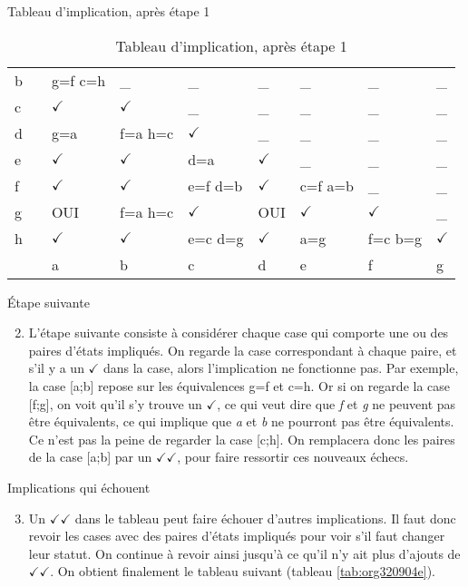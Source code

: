 \documentclass[presentation]{beamer}
\begin{document}
\begin{frame}[label={sec:orgd7b32e5}]{Tableau d'implication, après étape 1}
\begin{table}[h] \scriptsize
\caption{\label{tab:orgb2a419f}Tableau d'implication, après étape 1}
\centering
\begin{tabular}{lllllllll}
b &  & g=f c=h & \_ & \_ & \_ & \_ & \_ & \_\\
c &  & \(\checkmark\) & \(\checkmark\) & \_ & \_ & \_ & \_ & \_\\
d &  & g=a & f=a h=c & \(\checkmark\) & \_ & \_ & \_ & \_\\
e &  & \(\checkmark\) & \(\checkmark\) & d=a & \(\checkmark\) & \_ & \_ & \_\\
f &  & \(\checkmark\) & \(\checkmark\) & e=f d=b & \(\checkmark\) & c=f a=b & \_ & \_\\
g &  & OUI & f=a h=c & \(\checkmark\) & OUI & \(\checkmark\) & \(\checkmark\) & \_\\
h &  & \(\checkmark\) & \(\checkmark\) & e=c d=g & \(\checkmark\) & a=g & f=c b=g & \(\checkmark\)\\
\hline
 &  & a & b & c & d & e & f & g\\
\end{tabular}
\end{table}
\end{frame}

\begin{frame}[label={sec:org84bc354}]{Étape suivante}
\begin{enumerate}
\setcounter{enumi}{1}
\item L'étape suivante consiste à considérer chaque case qui comporte
une ou des paires d'états impliqués. On regarde la case
correspondant à chaque paire, et s'il y a un \(\checkmark\) dans la
case, alors l'implication ne fonctionne pas. Par exemple, la case
[a;b] repose sur les équivalences g=f et c=h. Or si on regarde la
case [f;g], on voit qu'il s'y trouve un \(\checkmark\), ce qui veut
dire que \emph{f} et \emph{g} ne peuvent pas être équivalents, ce qui
implique que \emph{a} et \emph{b} ne pourront pas être équivalents. Ce n'est
pas la peine de regarder la case [c;h].  On remplacera donc les
paires de la case [a;b] par un \(\checkmark \checkmark\), pour faire
ressortir ces nouveaux échecs.
\end{enumerate}
\end{frame}

\begin{frame}[label={sec:orgd66f98b}]{Implications qui échouent}
\begin{enumerate}
\setcounter{enumi}{2}
\item Un \(\checkmark \checkmark\) dans le tableau peut faire échouer d'autres
implications. Il faut donc revoir les cases avec des paires d'états
impliqués pour voir s'il faut changer leur statut. On continue à
revoir ainsi jusqu'à ce qu'il n'y ait plus d'ajouts de
\(\checkmark \checkmark\). On obtient finalement le tableau suivant
(tableau \ref{tab:org320904e}).
\end{enumerate}
\end{frame}
\end{document}
